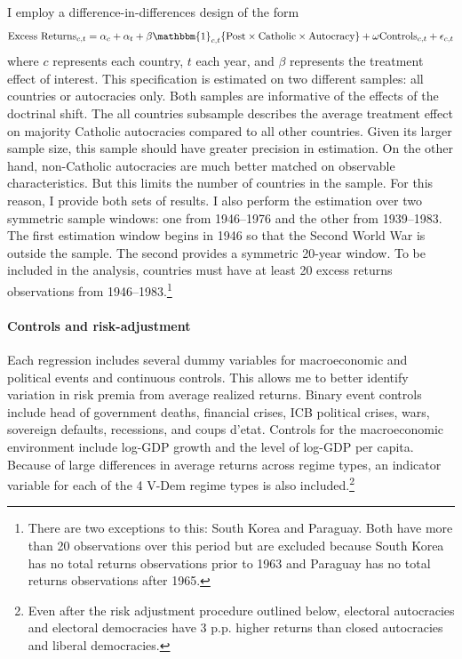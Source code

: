 I employ a difference-in-differences design of the form
\begin{multline}
\textrm{Excess Returns}_{c,t} = \alpha_{c}+\alpha_{t} +\beta\mathbbm{1}_{c,t}\{\textrm{Post}\times\textrm{Catholic}\times\textrm{Autocracy}\}  +\mathbf{\omega} \textrm{Controls}_{c,t}+\epsilon_{c,t} \label{eq:singleDiff}
\end{multline}
where $c$ represents each country, $t$ each year, and $\beta$ represents the treatment effect of interest.  This specification is estimated on two different samples: all countries or autocracies only.  Both samples are informative of the effects of the doctrinal shift. The all countries subsample describes the average treatment effect on majority Catholic autocracies compared to all other countries. Given its larger sample size, this sample should have greater precision in estimation.  On the other hand, non-Catholic autocracies are much better matched on observable characteristics. But this limits the number of countries in the sample. For this reason, I provide both sets of results. I also perform the estimation over two symmetric sample windows: one from 1946--1976 and the other from 1939--1983. The first estimation window begins in 1946 so that the Second World War is outside the sample. The second provides a symmetric 20-year window.  To be included in the analysis, countries must have at least 20 excess returns observations from 1946--1983.\footnote{There are two exceptions to this: South Korea and Paraguay. Both have more than 20 observations over this period but are excluded because South Korea has no total returns observations prior to 1963 and Paraguay has no total returns observations after 1965.}

\paragraph{Controls and risk-adjustment}
Each regression includes several dummy variables for macroeconomic and political events and continuous controls. This allows me to better identify variation in risk premia from average realized returns. Binary event controls include head of government deaths, financial crises, ICB political crises, wars, sovereign defaults,  recessions, and coups d'etat.  Controls for the macroeconomic environment include log-GDP growth and the level of log-GDP per capita. Because of large differences in average returns across regime types, an indicator variable for each of the 4 V-Dem regime types is also included.\footnote{Even after the risk adjustment procedure outlined below, electoral autocracies and electoral democracies have 3 p.p. higher returns than closed autocracies and liberal democracies. }

